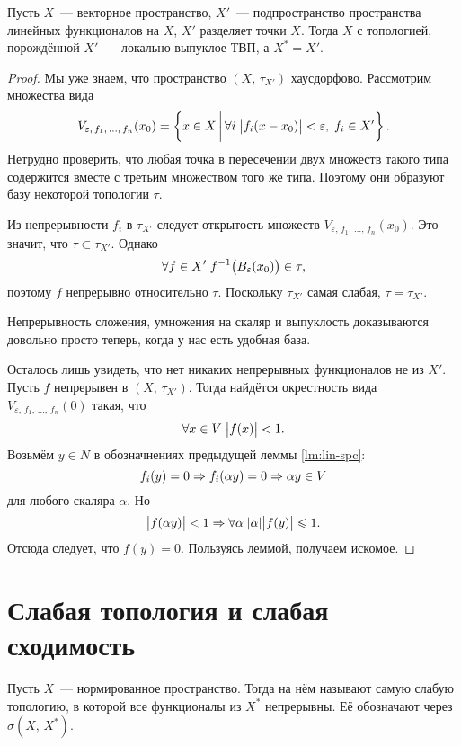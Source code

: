 \documentclass{notes}
\begin{document}
	\begin{thm}
		Пусть $X$~--- векторное пространство, $X'$~--- подпространство пространства линейных функционалов на $X$, $X'$ разделяет точки $X$. Тогда $X$ с топологией, порождённой $X'$~--- локально выпуклое ТВП, а $X^{*} = X'$.
		\begin{proof}
			Мы уже знаем, что пространство $(X, \, \tau_{X'})$ хаусдорфово. Рассмотрим множества вида
			\[
				V_{\varepsilon, \, f_1, \, \ldots, \, f_n}(x_0) = \left\{x \in X \, \bigg | \, \forall i \; \big|f_i(x - x_0)\big| < \varepsilon, \; f_i \in X'\right\}.
			\]
			Нетрудно проверить, что любая точка в пересечении двух множеств такого типа содержится вместе с третьим множеством того же типа. Поэтому они образуют базу некоторой топологии $\tau$.

			Из непрерывности $f_i$ в $\tau_{X'}$ следует открытость множеств $V_{\varepsilon, \, f_1, \, \ldots, \, f_n}(x_0)$. Это значит, что $\tau \subset \tau_{X'}$. Однако 
			\[
				\forall f \in X' \; f^{-1}\big(B_{\varepsilon}(x_0)\big) \in \tau,
			\]
			поэтому $f$ непрерывно относительно $\tau$. Поскольку $\tau_{X'}$ самая слабая, $\tau = \tau_{X'}$.

			Непрерывность сложения, умножения на скаляр и выпуклость доказываются довольно просто теперь, когда у нас есть удобная база. 

			Осталось лишь увидеть, что нет никаких непрерывных функционалов не из $X'$. Пусть $f$ непрерывен в $(X, \, \tau_{X'})$. Тогда найдётся окрестность вида $V_{\varepsilon, \, f_1, \, \ldots, \, f_n}(0)$ такая, что
			\[
				\forall x \in V \; \big|f(x)\big| < 1.
			\]
			Возьмём $y \in N$ в обозначнениях предыдущей леммы \ref{lm:lin-spc}:
			\[
				f_i(y) = 0 \Rightarrow f_i(\alpha y) = 0 \Rightarrow \alpha y \in V
			\]
			для любого скаляра $\alpha$. Но
			\[
				\big|f(\alpha y)\big| < 1 \Rightarrow \forall \alpha \; |\alpha| \big|f(y)\big| \leqslant 1.
			\]
			Отсюда следует, что $f(y) = 0$. Пользуясь леммой, получаем искомое.
		\end{proof}
	\end{thm}

\section{Слабая топология и слабая сходимость}

	\begin{de}
		Пусть $X$~--- нормированное пространство. Тогда  на нём называют самую слабую топологию, в которой все функционалы из $X^{*}$ непрерывны. Её обозначают через $\sigma(X, \, X^{*})$.
	\end{de}
\end{document}
